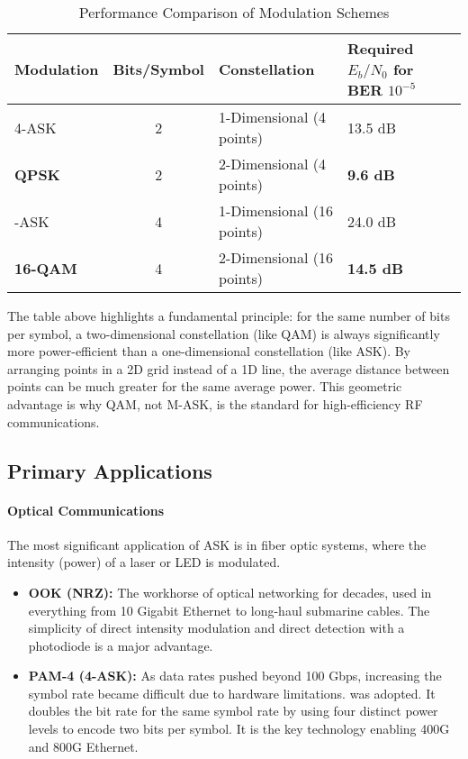 \begin{table}[H]
    \centering
    \caption{Performance Comparison of Modulation Schemes}
    \label{tab:ask-comparison}
    \begin{tabularx}{\textwidth}{@{}lcXX@{}}
        \toprule
        \tableheaderfont Modulation & \tableheaderfont Bits/Symbol & \tableheaderfont Constellation & \tableheaderfont Required $E_b/N_0$ for BER $10^{-5}$ \\
        \midrule
        4-ASK & 2 & 1-Dimensional (4 points) & 13.5 dB \\
        \textbf{QPSK} & 2 & 2-Dimensional (4 points) & \textbf{9.6 dB} \\
        \addlinespace
        16-ASK & 4 & 1-Dimensional (16 points) & 24.0 dB \\
        \textbf{16-QAM} & 4 & 2-Dimensional (16 points) & \textbf{14.5 dB} \\
        \bottomrule
    \end{tabularx}
\end{table}

\begin{importantbox}[title={Why QAM is Superior to M-ASK}]
    The table above highlights a fundamental principle: for the same number of bits per symbol, a two-dimensional constellation (like QAM) is always significantly more power-efficient than a one-dimensional constellation (like ASK). By arranging points in a 2D grid instead of a 1D line, the average distance between points can be much greater for the same average power. This geometric advantage is why QAM, not M-ASK, is the standard for high-efficiency RF communications.
\end{importantbox}


\subsection{Primary Applications}

\paragraph{Optical Communications}
The most significant application of ASK is in fiber optic systems, where the intensity (power) of a laser or LED is modulated.
\begin{itemize}
    \item \textbf{OOK (NRZ):} The workhorse of optical networking for decades, used in everything from 10 Gigabit Ethernet to long-haul submarine cables. The simplicity of direct intensity modulation and direct detection with a photodiode is a major advantage.
    \item \textbf{PAM-4 (4-ASK):} As data rates pushed beyond 100 Gbps, increasing the symbol rate became difficult due to hardware limitations.  was adopted. It doubles the bit rate for the same symbol rate by using four distinct power levels to encode two bits per symbol. It is the key technology enabling 400G and 800G Ethernet.
\end{itemize}

